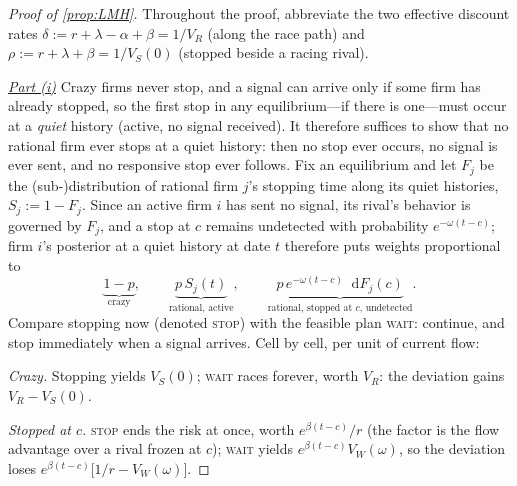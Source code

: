 \documentclass[12pt,reqno]{article}
\newcommand{\de}{\mathop{}\!\mathrm{d}}
\theoremstyle{definition} \newtheorem{example}{Example}
\theoremstyle{definition} \newtheorem{condition}{Condition}
\theoremstyle{definition} \newtheorem{corollary}{Corollary}
\theoremstyle{definition} \newtheorem{claim}{Claim}
\theoremstyle{definition} \newtheorem{definition}{Definition}
\theoremstyle{definition} \newtheorem{conjecture}{Conjecture}
\theoremstyle{definition} \newtheorem{Lemma}{Lemma}
\theoremstyle{definition} \newtheorem{lemma}{Lemma}
\theoremstyle{plain} \newtheorem{theorem}{Theorem}
\theoremstyle{definition} \newtheorem{assumption}{Assumption}
\theoremstyle{definition} \newtheorem*{assumptionnonumber}{Assumption}
\theoremstyle{definition} \newtheorem*{theoremNoNumber}{Proposition}
\theoremstyle{definition}
\theoremstyle{definition}\newtheorem{proposition}{Proposition}
\theoremstyle{definition} \newtheorem{result}{Result}
\theoremstyle{definition} \newtheorem*{definitionNoNumber}{Definition}
\theoremstyle{definition} \newtheorem{Definition}{Definition}
\theoremstyle{definition} \newtheorem*{DefinitionNoNumber}{Definition}
\theoremstyle{definition} \newtheorem*{fact}{Fact}
\theoremstyle{definition} \newtheorem*{property}{Property}
\theoremstyle{definition} \newtheorem{remark}{Remark}
\begin{document}
\begin{proof}[Proof of \cref{prop:LMH}]
Throughout the proof, abbreviate the two effective discount rates $\delta:=r+\lambda-\alpha+\beta=1/V_R$ (along the race path) and $\rho:=r+\lambda+\beta=1/V_S(0)$ (stopped beside a racing rival).

\noindent \underline{\emph{Part (i)}} Crazy firms never stop, and a signal can arrive only if some firm has already stopped, so the first stop in any equilibrium---if there is one---must occur at a \emph{quiet} history (active, no signal received). It therefore suffices to show that no rational firm ever stops at a quiet history: then no stop ever occurs, no signal is ever sent, and no responsive stop ever follows. Fix an equilibrium and let $F_j$ be the (sub-)distribution of rational firm $j$'s stopping time along its quiet histories, $S_j:=1-F_j$. Since an active firm $i$ has sent no signal, its rival's behavior is governed by $F_j$, and a stop at $c$ remains undetected with probability $e^{-\omega(t-c)}$; firm $i$'s posterior at a quiet history at date $t$ therefore puts weights proportional to
\[
\underbrace{1-p}_{\text{crazy}},\qquad
\underbrace{p\,S_j(t)}_{\text{rational, active}},\qquad
\underbrace{p\,e^{-\omega(t-c)}\de F_j(c)}_{\text{rational, stopped at }c\text{, undetected}} .
\]
Compare stopping now (denoted \textsc{stop}) with the feasible plan \textsc{wait}: continue, and stop immediately when a signal arrives. Cell by cell, per unit of current flow:

\noindent \emph{Crazy.} Stopping yields $V_S(0)$; \textsc{wait} races forever, worth $V_R$: the deviation gains $V_R-V_S(0)$.

\noindent  \emph{Stopped at $c$.} \textsc{stop} ends the risk at once, worth $e^{\beta(t-c)}/r$ (the factor is the flow advantage over a rival frozen at $c$); \textsc{wait} yields  $e^{\beta(t-c)}V_W(\omega)$, so  the deviation loses $e^{\beta(t-c)}\big[1/r-V_W(\omega)\big]$.


\end{proof}
\end{document}
